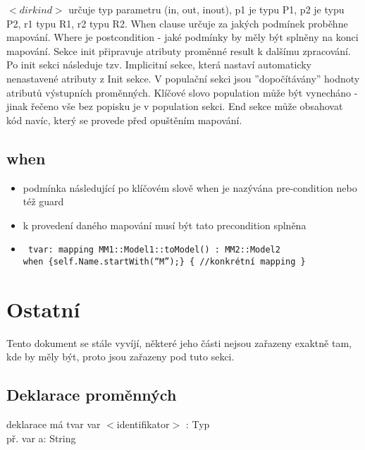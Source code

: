 \documentclass[11pt,a4paper]{article}   	%
\begin{document}
$<dirkind>$ určuje typ parametru (in, out, inout), p1 je typu P1, p2 je typu P2,
r1 typu R1, r2 typu R2. When clause určuje za jakých podmínek proběhne mapování.
Where je postcondition - jaké podmínky by měly být splněny na konci mapování.
Sekce init připravuje atributy proměnné result k dalšímu zpracování. Po init
sekci následuje tzv. Implicitní sekce, která nastaví automaticky nenastavené
atributy z Init sekce. V populační sekci jsou ''dopočítávány'' hodnoty atributů
výstupních proměnných. Klíčové slovo population může být vynecháno - jinak
řečeno vše bez popisku je v population sekci. End sekce může obsahovat kód
navíc, který se provede před opuštěním mapování.

\subsection{when}
\begin{itemize}
  	\item 	podmínka následující po klíčovém slově when je nazývána
			pre-condition nebo též guard
	\item	k provedení daného mapování musí být tato precondition splněna
	\item	\texttt { 
					tvar: mapping MM1::Model1::toModel() : MM2::Model2 \\
					when \{self.Name.startWith(“M”);\} \{ //konkrétní mapping \}
			}			 
\end{itemize}


\section{Ostatní}
Tento dokument se stále vyvíjí, některé jeho části nejsou zařazeny exaktně tam,
kde by měly být, proto jsou zařazeny pod tuto sekci.

\subsection{Deklarace proměnných}
deklarace má tvar var $<$identifikator$>$ : Typ \\
př. var a: String
\end{document}
